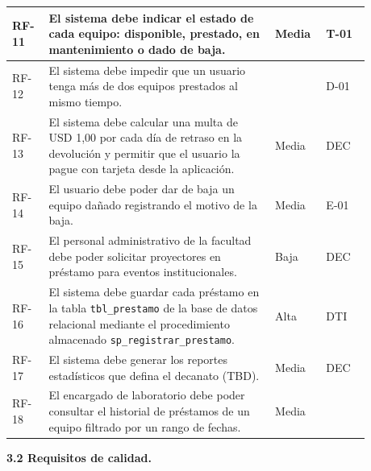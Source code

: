 \documentclass[11pt]{article}
\begin{document}
{\begin{longtable}{L{0.08\linewidth}L{0.58\linewidth}C{0.11\linewidth}C{0.11\linewidth}}
		\hline
		RF-11 & El sistema debe indicar el estado de cada equipo: disponible, prestado, en mantenimiento o dado de baja. & Media & T-01\\
		\hline
		 RF-12 & El sistema debe impedir que un usuario tenga más de dos equipos prestados al mismo tiempo. & & D-01\\
		\hline
		RF-13 & El sistema debe calcular una multa de USD 1,00 por cada día de retraso en la devolución y permitir que el usuario la pague con tarjeta desde la aplicación. & Media & DEC\\
		\hline
		 RF-14 & El usuario debe poder dar de baja un equipo dañado registrando el motivo de la baja. & Media & E-01\\
		\hline
		RF-15 & El personal administrativo de la facultad debe poder solicitar proyectores en préstamo para eventos institucionales. & Baja & DEC\\
		\hline
		 RF-16 & El sistema debe guardar cada préstamo en la tabla \texttt{tbl\_prestamo} de la base de datos relacional mediante el procedimiento almacenado \texttt{sp\_registrar\_prestamo}. & Alta & DTI\\
		\hline
		RF-17 & El sistema debe generar los reportes estadísticos que defina el decanato (TBD). & Media & DEC\\
		\hline
		 RF-18 & El encargado de laboratorio debe poder consultar el historial de préstamos de un equipo filtrado por un rango de fechas. & Media & \\
		\hline
	\end{longtable}
}

\textbf{3.2 Requisitos de calidad.}
\end{document}

